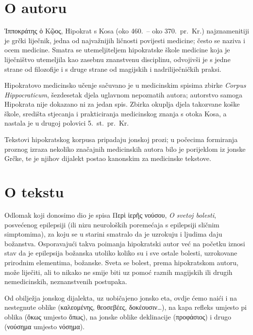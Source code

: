 \section*{O autoru}

\textgreek[variant=ancient]{Ἱπποκράτης ὁ Κῷος,} Hipokrat s Kosa (oko 460.\ – oko 370.\ pr.~Kr.) najznamenitiji je grčki liječnik, jedna od najvažnijih ličnosti povijesti medicine; često se naziva i ocem medicine. Smatra se utemeljiteljem hipokratske škole medicine koja je liječništvo utemeljila kao zasebnu znanstvenu disciplinu, odvojivši je s jedne strane od filozofije i s druge strane od magijskih i nadriliječničkih praksi. 

Hipokratovo medicinsko učenje sačuvano je u medicinskim spisima zbirke \textit{Corpus Hippocraticum}, šezdesetak djela uglavnom nepoznatih autora; autorstvo samoga Hipokrata nije dokazano ni za jedan spis. Zbirka okuplja djela takozvane koške škole, središta stjecanja i prakticiranja medicinskog znanja s otoka Kosa, a nastala je u drugoj polovici 5.~st.\ pr.~Kr.

Tekstovi hipokratskog korpusa pripadaju jonskoj prozi; u počecima formiranja proznog izraza nekoliko značajnih medicinskih autora bilo je porijeklom iz jonske Grčke, te je njihov dijalekt postao kanonskim za medicinske tekstove. 

\section*{O tekstu}

Odlomak koji donosimo dio je spisa \textgreek[variant=ancient]{Περὶ ἱερῆς νούσου,} \textit{O svetoj bolesti}, posvećenog epilepsiji (ili nizu neuroloških poremećaja s epilepsiji sličnim simptomima), za koju se u starini smatralo da je uzrokuju i ljudima daju božanstva. Osporavajući takva poimanja hipokratski autor već na početku iznosi stav da je epilepsija božanska utoliko koliko su i sve ostale bolesti, uzrokovane prirodnim elementima, božanske. Sveta se bolest, prema hipokratskom autoru, može liječiti, ali to nikako ne smije biti uz pomoć raznih magijskih ili drugih nemedicinskih, neznanstvenih postupaka.

Od obilježja jonskog dijalekta, uz uobičajeno jonsko eta, ovdje ćemo naići i na nestegnute oblike \textgreek[variant=ancient]{(καλεομένης, θεοσεβέες, δοκέουσιν\dots),} na kapa refleks umjesto pi oblika \textgreek[variant=ancient]{(ὅκως} umjesto \textgreek[variant=ancient]{ὅπως),} na jonske oblike deklinacije \textgreek[variant=ancient]{(προφάσιος)} i drugo \textgreek[variant=ancient]{(νούσημα} umjesto \textgreek[variant=ancient]{νόσημα).}

